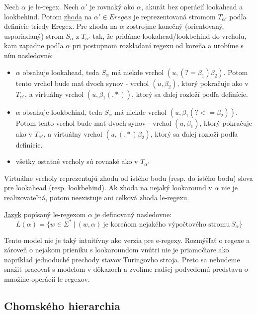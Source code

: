 \begin{df}
Nech $\alpha$ je le-regex. Nech $\alpha '$ je rovnaký ako $\alpha$, akurát bez operácií lookahead a lookbehind. Potom \underline{zhoda} na $\alpha ' \in Eregex$ je reprezentovaná stromom $T_{\alpha '}$ podľa definície triedy Eregex. Pre zhodu na $\alpha$ zostrojme konečný (orientovaný, usporiadaný) strom $S_\alpha$ z $T_{\alpha '}$ tak, že pridáme lookahead/lookbehind do vrcholu, kam zapadne podľa $\alpha$ pri postupnom rozkladaní regexu od koreňa a urobíme s ním nasledovné:
\begin{itemize}
  \item  $\alpha$ obsahuje lookahead, teda $S_\alpha$ má niekde vrchol $(u, (?=\beta_1 )\beta_2)$. Potom tento vrchol bude mať dvoch synov - vrchol $(u,\beta_2)$, ktorý pokračuje ako v $T_{\alpha '}$, a virtuálny vrchol $(u,\beta_1 (.*))$, ktorý sa ďalej rozloží podľa definície.
  \item  $\alpha$ obsahuje lookbehind, teda $S_\alpha$ má niekde vrchol $(u, \beta_1(?<=\beta_2))$. Potom tento vrchol bude mať dvoch synov - vrchol $(u,\beta_1)$, ktorý pokračuje ako v $T_{\alpha '}$, a virtuálny vrchol $(u,(.*)\beta_2)$, ktorý sa ďalej rozloží podľa definície.
  \item všetky ostatné vrcholy sú rovnaké ako v $T_{\alpha '}$
\end{itemize}
Virtuálne vrcholy reprezentujú zhodu od istého bodu (resp. do istého bodu) slova pre lookahead (resp. lookbehind). Ak zhoda na nejaký lookaround v $\alpha$ nie je realizovateľná, potom neexistuje ani celková zhoda le-regexu.
\end{df}
\begin{df}
\underline{Jazyk} popísaný le-regexom $\alpha$ je definovaný nasledovne: 
$$L(\alpha ) = \lbrace w \in \Sigma ^* ~|~ (w, \alpha)~\text{je~koreňom~nejakého~výpočtového~stromu}~S_\alpha \rbrace$$
\end{df}

Tento model nie je taký intuitívny ako verzia pre e-regexy. Rozmýšľať o regexe a zároveň o nejakom prieniku s lookaroundom vnútri nie je priamočiare ako napríklad jednoduché prechody stavov Turingovho stroja. Preto sa nebudeme snažiť pracovať s modelom v dôkazoch a zvolíme radšej podvedomú predstavu o množine operácií le-regexov.

\subsection{Chomského hierarchia}

